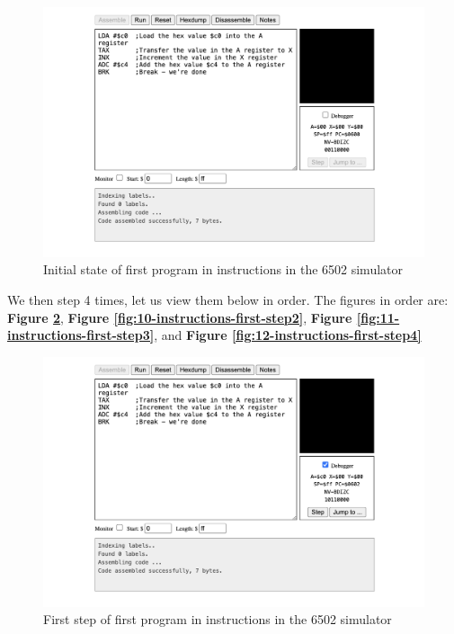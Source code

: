 \documentclass[a4paper]{article}
\begin{document}
\begin{figure}[H]
    \centering
    \includegraphics[width=1.0\textwidth]{res/images/q2/08-instructions-first-initial.png}
    \caption{Initial state of first program in instructions in the 6502 simulator}
    \label{fig:08-instructions-first-initial}
\end{figure}

We then step 4 times, let us view them below in order. The figures in order are: \textbf{Figure \ref{fig:09-instructions-first-step1}}, \textbf{Figure \ref{fig:10-instructions-first-step2}}, \textbf{Figure \ref{fig:11-instructions-first-step3}}, and \textbf{Figure \ref{fig:12-instructions-first-step4}}

\begin{figure}[H]
    \centering
    \includegraphics[width=1.0\textwidth]{res/images/q2/09-instructions-first-step1.png}
    \caption{First step of first program in instructions in the 6502 simulator}
    \label{fig:09-instructions-first-step1}
\end{figure}
\end{document}
